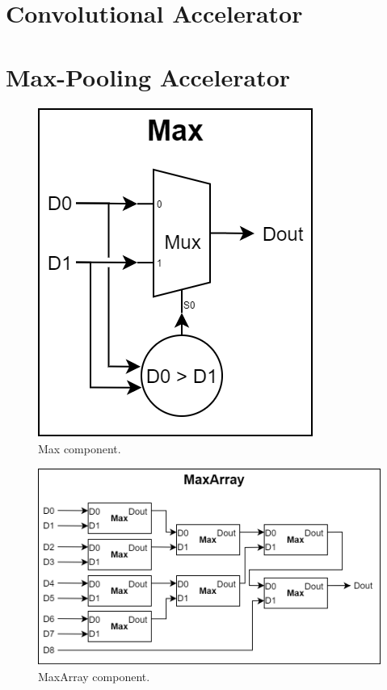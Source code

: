 \section{Convolutional Accelerator}
\section{Max-Pooling Accelerator}


\begin{figure} [H]
	\centering
	\includegraphics[scale=0.4]{Images/Platform/Max_component.png}
	\decoRule
	\caption[Max component]{Max component.}
	\label{fig:max-component}
\end{figure}

\begin{figure} [H]
	\centering
	\includegraphics[width=\textwidth]{Images/Platform/MaxArray_component.png}
	\decoRule
	\caption[MaxArray component]{MaxArray component.}
	\label{fig:max-array-component}
\end{figure}

